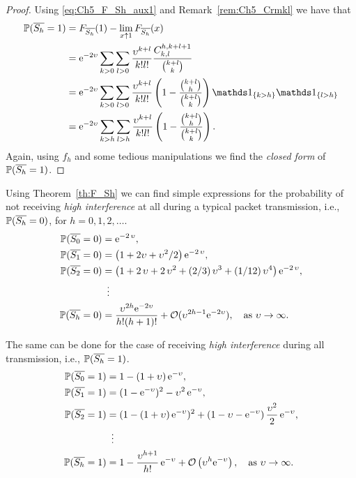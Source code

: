 \begin{proof}
    Using \eqref{eq:Ch5_F_Sh_aux1} and Remark~\ref{rem:Ch5_Crmkl} we have that
    \begin{align*}
	\P(\overline{S_h}=1)
	    &= F_{\overline{S_h}}(1) - \lim_{x\uparrow 1} F_{\overline{S_h}}(x)\\
    	&= \euler^{-2\upsilon}\sum_{k > 0}\sum_{l > 0} \frac{\upsilon^{k+l}}{k!l!} \dfrac{C_{k,l}^{h,k+l+1}}{\binom{k+l}{k}}\\
    	&= \euler^{-2\upsilon} \sum_{k > 0}\sum_{l > 0} \frac{\upsilon^{k+l}}{k!l!} \left( 1 - \frac{\binom{k+l}{h}}{\binom{k+l}{k}} \right)\ind_{\{k>h\}}\ind_{\{l>h\}}\\
    	&= \euler^{-2\upsilon} \sum_{k > h}\sum_{l > h} \frac{\upsilon^{k+l}}{k!l!} \left( 1 - \frac{\binom{k+l}{h}}{\binom{k+l}{k}} \right).
    \end{align*}
    Again, using $f_h$ and some tedious manipulations we find the \textit{closed form} of $\P(\overline{S_h} = 1)$.
\end{proof}

Using Theorem~\ref{th:F_Sh} we can find simple expressions for the probability of not receiving \textit{high interference} at all during a typical packet transmission, i.e., $\P(\overline{S_h} = 0)$, for $h=0,1,2,\dots$.
%
\begin{align*}
    \P(\overline{S_0} = 0) &= \euler^{-2\,\upsilon},\\
    \P(\overline{S_1} = 0) &= \left( 1+2\upsilon+{\upsilon}^{2}/2 \right){\euler^{-2\,\upsilon}} ,\\
    \P(\overline{S_2} = 0) &= \left( 1+2\,\upsilon+2\,\upsilon^2+(2/3)\,\upsilon^3+(1/12)\,\upsilon^4 \right){{\euler}^{-2\,\upsilon}},\\
                &~\,\vdots\\
    \P(\overline{S_h} = 0) &= \frac{\upsilon^{2h}\euler^{-2\upsilon}}{h!(h+1)!} + \cal{O}(\upsilon^{2h-1}\euler^{-2\upsilon}), \quad \text{as } \upsilon\to\infty.
\end{align*}

The same can be done for the case of receiving \textit{high interference} during all transmission, i.e., $\P(\overline{S_h} = 1)$.
%
\begin{align*}
    \P(\overline{S_0} = 1) &= 1 - (1+\upsilon)\,\euler^{-\upsilon},\\
    \P(\overline{S_1} = 1) &= (1-\euler^{-\upsilon})^2 - \upsilon^2\,\euler^{-\upsilon},\\
    \P(\overline{S_2} = 1) &= (1-(1+\upsilon)\,\euler^{-\upsilon})^2 + (1-\upsilon-\euler^{-\upsilon})\,\frac{\upsilon^2}{2}\,\euler^{-\upsilon},\\
        &~\,\vdots\\
    \P(\overline{S_h} = 1) &= 1 - \frac{\upsilon^{h+1}}{h!}\,\euler^{-\upsilon} + \cal{O}\left(\upsilon^h\euler^{-\upsilon}\right), \quad \text{as } \upsilon\to\infty.
\end{align*}

